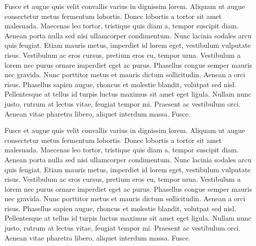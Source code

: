 Fusce et augue quis velit convallis varius in dignissim lorem. 
Aliquam ut augue consectetur metus fermentum lobortis. Donec lobortis 
a tortor sit amet malesuada. Maecenas leo tortor, tristique quis 
diam a, tempor suscipit diam. Aenean porta nulla sed nisi ullamcorper 
condimentum. Nunc lacinia sodales arcu quis feugiat. Etiam mauris 
metus, imperdiet id lorem eget, vestibulum vulputate risus. Vestibulum 
ac eros cursus, pretium eros eu, tempor urna. Vestibulum a lorem 
nec purus ornare imperdiet eget ac purus. Phasellus congue semper 
mauris nec gravida. Nunc porttitor metus et mauris dictum sollicitudin.
Aenean a orci risus. Phasellus sapien augue, rhoncus et molestie blandit, 
volutpat sed nisl. Pellentesque at tellus id turpis luctus maximus 
sit amet eget ligula. Nullam nunc justo, rutrum at lectus vitae, 
feugiat tempor mi. Praesent ac vestibulum orci. Aenean vitae pharetra 
libero, aliquet interdum massa. Fusce.

Fusce et augue quis velit convallis varius in dignissim lorem. 
Aliquam ut augue consectetur metus fermentum lobortis. Donec lobortis 
a tortor sit amet malesuada. Maecenas leo tortor, tristique quis 
diam a, tempor suscipit diam. Aenean porta nulla sed nisi ullamcorper 
condimentum. Nunc lacinia sodales arcu quis feugiat. Etiam mauris 
metus, imperdiet id lorem eget, vestibulum vulputate risus. Vestibulum 
ac eros cursus, pretium eros eu, tempor urna. Vestibulum a lorem 
nec purus ornare imperdiet eget ac purus. Phasellus congue semper 
mauris nec gravida. Nunc porttitor metus et mauris dictum sollicitudin.
Aenean a orci risus. Phasellus sapien augue, rhoncus et molestie blandit, 
volutpat sed nisl. Pellentesque at tellus id turpis luctus maximus 
sit amet eget ligula. Nullam nunc justo, rutrum at lectus vitae, 
feugiat tempor mi. Praesent ac vestibulum orci. Aenean vitae pharetra 
libero, aliquet interdum massa. Fusce.

\newpage
\thispagestyle{empty}
\mbox{}

\newpage